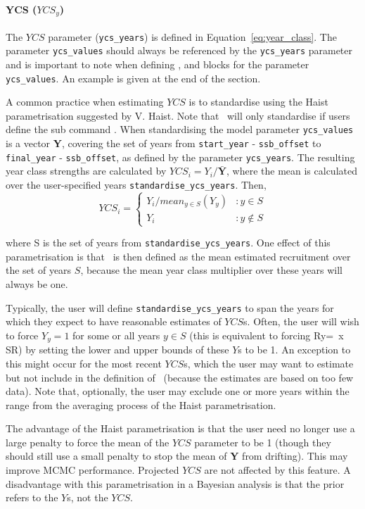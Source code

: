 \paragraph*{YCS ($YCS_y$)}
The $YCS$ parameter (\texttt{ycs\_years})  is defined in Equation~\eqref{eq:year_class}. The parameter \texttt{ycs\_values} should always be referenced by the \texttt{ycs\_years} parameter and is important to note when defining ,  and  blocks for the parameter \texttt{ycs\_values}. An example is given at the end of the section.

A common practice when estimating $YCS$ is to standardise using the Haist parametrisation suggested by V. Haist. Note that \CNAME\ will only standardise if users define the sub command . When standardising the model parameter \texttt{ycs\_values} is a vector \textbf{Y}, covering the set of years from \texttt{start\_year} - \texttt{ssb\_offset} to \texttt{final\_year} - \texttt{ssb\_offset}, as defined by the parameter \texttt{ycs\_years}. The resulting year class strengths are calculated by $YCS_i=Y_i/\bar{\textbf{Y}}$, where the mean is calculated over the user-specified years \texttt{standardise\_ycs\_years}. Then,
\[
YCS_i = 
\begin{cases}
Y_i / mean_{y \in S}(Y_y) & :y \in S\\
Y_i					 & :y \notin S
\end{cases}
\]

where S is the set of years from \texttt{standardise\_ycs\_years}. One effect of this parametrisation is that \Rzero\ is then defined as the mean estimated recruitment over the set of years $S$, because the mean year class multiplier over these years will always be one.

Typically, the user will define \texttt{standardise\_ycs\_years} to span the years for which they expect to have reasonable estimates of $YCS$s. Often, the user will wish to force $Y_y=1$ for some or all years $y\in S$ (this is equivalent to forcing Ry=\Rzero\ x SR) by setting the lower and upper bounds of these $Y$s to be 1. An exception to this might occur for the most recent $YCS$s, which the user may want to estimate but not include in the definition of \Rzero\ (because the estimates are based on too few data). Note that, optionally, the user may exclude one or more years within the range from the averaging process of the Haist parametrisation. 

The advantage of the Haist parametrisation is that the user need no longer use a large penalty to force the mean of the $YCS$ parameter to be 1 (though they should still use a small penalty to stop the mean of \textbf{Y} from drifting). This may improve MCMC performance.  Projected $YCS$ are not affected by this feature. A disadvantage with this parametrisation in a Bayesian analysis is that the prior refers to the $Y$s, not the $YCS$.

